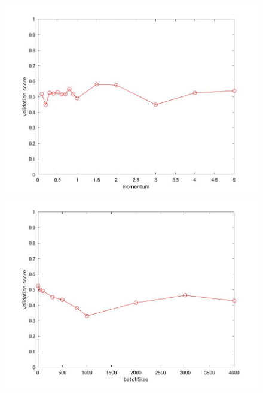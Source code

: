\documentclass[a4j,11pt]{jarticle}
\begin{document}
\begin{figure}
	\begin{minipage}{0.50\hsize}
		\begin{center}
			\includegraphics[width=12cm, bb=0 0 875 656]{../matlab/fig/momentum.jpg}
		\end{center}
	\end{minipage}
	\begin{minipage}{0.50\hsize}
		\begin{center}
			\includegraphics[width=12cm, bb=0 0 875 656]{../matlab/fig/batchSize.jpg}
		\end{center}
	\end{minipage}
	\\
	\begin{minipage}{0.50\hsize}
		\begin{center}

\end{center}
\end{minipage}
\end{figure}
\end{document}
